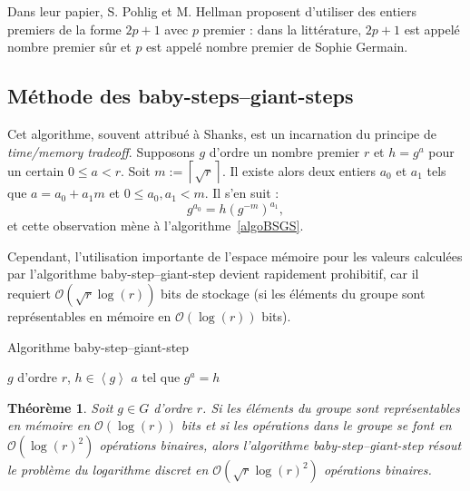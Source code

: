 \documentclass[a4paper, titlepage]{article}
\newtheorem{theo}{Théorème}[section]
\theoremstyle{definition}
\theoremstyle{remark}
\def\O{\mathcal O}
\def\gen #1{\left\langle#1\right\rangle}
\def\ceil #1{\left\lceil#1\right\rceil}
\begin{document}
Dans leur papier, S. Pohlig et M. Hellman proposent d'utiliser des entiers premiers de la forme $2p + 1$ avec $p$ premier : dans la littérature, $2p + 1$ est appelé nombre premier sûr et $p$ est appelé nombre premier de Sophie Germain.

\subsection{Méthode des baby-steps--giant-steps}
\label{BSGS}

Cet algorithme, souvent attribué à Shanks, est un incarnation du principe de \textit{time/memory tradeoff}. Supposons $g$ d'ordre un nombre premier $r$ et $h = g^a$ pour un certain $0 \leqslant a < r$. Soit $m := \ceil{\sqrt{r}}$. Il existe alors deux entiers $a_0$ et $a_1$ tels que $a = a_0 + a_1m$ et $0 \leqslant a_0, a_1 < m$. Il s'en suit :
$$g^{a_0} = h{(g^{-m})}^{a_1},$$
et cette observation mène à l'algorithme~\ref{algoBSGS}.

Cependant, l'utilisation importante de l'espace mémoire pour les valeurs calculées par l'algorithme baby-step--giant-step devient rapidement prohibitif, car il requiert $\O(\sqrt{r}\log(r))$ bits de stockage (si les éléments du groupe sont représentables en mémoire en $\O(\log(r))$ bits).

\begin{algorithm}[H]
\caption{Algorithme baby-step--giant-step}
\label{algoBSGS}
\begin{algorithmic}[1]
\REQUIRE $g$ d'ordre $r$, $h \in \gen{g}$
\ENSURE $a$ tel que $g^a = h$
\STATE{$m \gets \ceil{\sqrt{r}}$}
\ENDFOR
{}
\ENDWHILE
{}
\end{algorithmic}
\end{algorithm}

\begin{theo}
Soit $g \in G$ d'ordre $r$. Si les éléments du groupe sont représentables en mémoire en $\O(\log(r))$ bits et si les opérations dans le groupe se font en $\O(\log(r)^2)$ opérations binaires, alors l'algorithme baby-step--giant-step résout le problème du logarithme discret en $\O(\sqrt{r}\log(r)^2)$ opérations binaires.
\end{theo}
\end{document}
